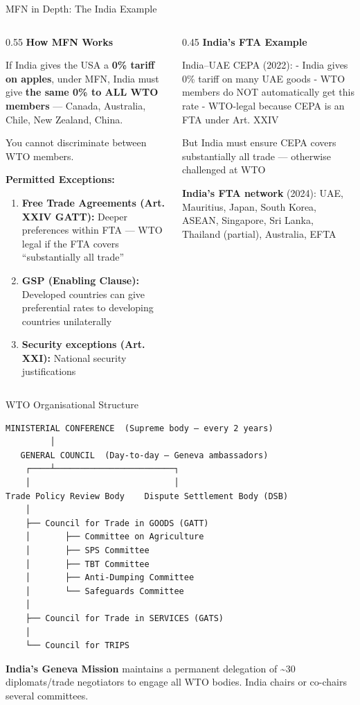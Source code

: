 \documentclass[
  ignorenonframetext,
  aspectratio=169,
]{beamer}
\makeatletter
\providecommand{\tightlist}{%
  \setlength{\itemsep}{0pt}\setlength{\parskip}{0pt}}
\let\quarto@originallabel\label
\DeclareRobustCommand*{\label}[1]{\quarto@originallabel{#1}}
\makeatother
\begin{document}
\begin{frame}{MFN in Depth: The India Example}
\label{mfn-in-depth-the-india-example}
\begin{columns}[T]
\begin{column}{0.55\linewidth}
\textbf{How MFN Works}

If India gives the USA a \textbf{0\% tariff on apples}, under MFN, India
must give \textbf{the same 0\% to ALL WTO members} --- Canada,
Australia, Chile, New Zealand, China.

You cannot discriminate between WTO members.

\textbf{Permitted Exceptions:}

\begin{enumerate}
\tightlist
\item
  \textbf{Free Trade Agreements (Art. XXIV GATT):} Deeper preferences
  within FTA --- WTO legal if the FTA covers ``substantially all trade''
\item
  \textbf{GSP (Enabling Clause):} Developed countries can give
  preferential rates to developing countries unilaterally
\item
  \textbf{Security exceptions (Art. XXI):} National security
  justifications
\end{enumerate}
\end{column}

\begin{column}{0.45\linewidth}
\textbf{India's FTA Example}

India--UAE CEPA (2022): - India gives 0\% tariff on many UAE goods - WTO
members do NOT automatically get this rate - WTO-legal because CEPA is
an FTA under Art. XXIV

But India must ensure CEPA covers substantially all trade --- otherwise
challenged at WTO

\textbf{India's FTA network} (2024): UAE, Mauritius, Japan, South Korea,
ASEAN, Singapore, Sri Lanka, Thailand (partial), Australia, EFTA
\end{column}
\end{columns}
\end{frame}

\begin{frame}[fragile]{WTO Organisational Structure}
\label{wto-organisational-structure}
\begin{verbatim}
MINISTERIAL CONFERENCE  (Supreme body — every 2 years)
         │
   GENERAL COUNCIL  (Day-to-day — Geneva ambassadors)
    ┌────┴────────────────────────┐
    │                             │
Trade Policy Review Body    Dispute Settlement Body (DSB)
    │
    ├── Council for Trade in GOODS (GATT)
    │       ├── Committee on Agriculture
    │       ├── SPS Committee
    │       ├── TBT Committee
    │       ├── Anti-Dumping Committee
    │       └── Safeguards Committee
    │
    ├── Council for Trade in SERVICES (GATS)
    │
    └── Council for TRIPS
\end{verbatim}

\textbf{India's Geneva Mission} maintains a permanent delegation of
\textasciitilde30 diplomats/trade negotiators to engage all WTO bodies.
India chairs or co-chairs several committees.
\end{frame}
\end{document}
